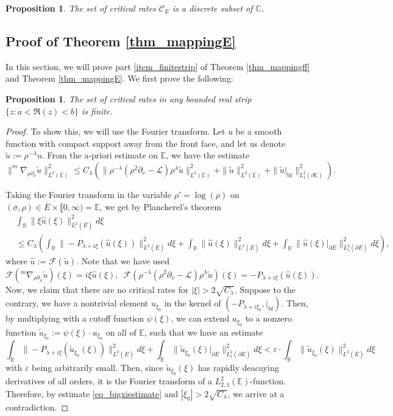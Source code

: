 \documentclass[10pt, a4paper]{article}
\theoremstyle{plain}%
\newtheorem{prop}[theorem]{Proposition}
\theoremstyle{definition}
\numberwithin{figure}{section}
\numberwithin{equation}{section}
\newcommand{\bR}{\mathbb{R}}
\newcommand{\bC}{\mathbb{C}}
\newcommand{\bE}{\mathbb{E}}
\newcommand{\pa}{\partial}
\newcommand{\tu}{\tilde{u}}
\newcommand{\ep}{\varepsilon}
\newcommand{\cL}{\mathcal{L}}
\newcommand{\oE}{{\overline{E}}}
\newcommand{\botf}{\textrm{bf}}
\newcommand{\cC}{\mathcal{C}}
\newcommand{\cF}{\mathcal{F}}
\begin{document}
\begin{prop}\label{prop_discretecritrates}
	The set of critical rates $\cC_E$ is a discrete subset of $\bC$.
\end{prop}


\subsection{Proof of Theorem \ref{thm_mappingE}}
In this section, we will prove part \ref{item_finitestrip} of Theorem \ref{thm_mappingff} and Theorem \ref{thm_mappingE}. We first prove the following:
\begin{prop}\label{prop_sparsekernel}
	The set of critical rates in any bounded real strip $\{z : a < \Re(z) < b\}$ is finite.
\end{prop}
\begin{proof}To show this, we will use the Fourier transform. Let $u$ be a smooth function with compact support away from the front face, and let us denote $\tu := \rho^{-\lambda}u$. From the a-priori estimate on $\bE$, we have the estimate \[
	\|^m\nabla_{\rho\pa_\rho}\tu\|^2_{L^2(\bE)}\leq C_\lambda(\|\rho^{-\lambda}(\rho^2\pa_v-\cL)\rho^\lambda\tu \|^2_{L^2(\bE)}+\|\tu\|^2_{L^2(\bE)}+\|\tu|_{\botf}\|^2_{L^2_{1}(\pa\bE)}).
	\]
	
	Taking the Fourier transform in the variable $\rho'=\log(\rho)$ on $(\sigma,\rho)\in\oE\times \llbracket0,\infty) = \bE$, we get by Plancherel's theorem \begin{equation}\label{eq_bigxiestimate}
		\begin{split}
		&\int_{\bR}\|\xi\hat{u}(\xi)\|^2_{L^2(\oE)}d\xi\\
		&\leq C_\lambda\left(\int_{\bR}\|-P_{\lambda+i\xi}(\hat{u}(\xi))\|^2_{L^2(\oE)}d\xi + \int_{\bR}\|\hat{u}(\xi)\|^2_{L^2(\oE)}d\xi + \int_{\bR}\|\hat{u}(\xi)|_{\pa\oE}\|^2_{L^2_1(\pa\oE)}d\xi\right),
		\end{split}
	\end{equation}
	where $\hat{u}:= \cF(\tu)$. Note that we have used \[
	\cF(^m\nabla_{\rho\pa_\rho}\tu)(\xi) = i\xi\hat{u}(\xi), \;\: \cF(\rho^{-\lambda}(\rho^2\pa_v-\cL)\rho^\lambda\tu)(\xi) = -P_{\lambda+i\xi}(\hat{u}(\xi)).
	\]
	Now, we claim that there are no critical rates for $|\xi|>2\sqrt{C_\lambda}$. Suppose to the contrary, we have a nontrivial element $u_{\xi_0}$ in the kernel of $(-P_{\lambda+i\xi_0},|_{\botf})$. Then, by multiplying with a cutoff function $\psi(\xi)$, we can extend $u_{\xi_0}$ to a nonzero function $\tu_{\xi_0}:= \psi(\xi)\cdot u_{\xi_0}$ on all of $\bE$, such that we have an estimate \[
	\int_{\bR}\|-P_{\lambda+i\xi}(\tu_{\xi_0}(\xi))\|^2_{L^2(\oE)}d\xi + \int_{\bR}\|\tu_{\xi_0}(\xi)|_{\pa\oE}\|^2_{L^2_1(\pa\oE)}d\xi < \ep\cdot \int_{\bR}\|\tu_{\xi_0}(\xi)\|^2_{L^2(\oE)}d\xi
	\]
	with $\ep$ being arbitrarily small.
	Then, since $\tu_{\xi_0}(\xi)$ has rapidly deacaying derivatives of all orders, it is the Fourier transform of a $L^2_{2,1}(\bE)$-function. Therefore, by estimate \eqref{eq_bigxiestimate} and $|\xi_0|>2\sqrt{C_\lambda}$, we arrive at a contradiction.
	

\end{proof}
\end{document}
